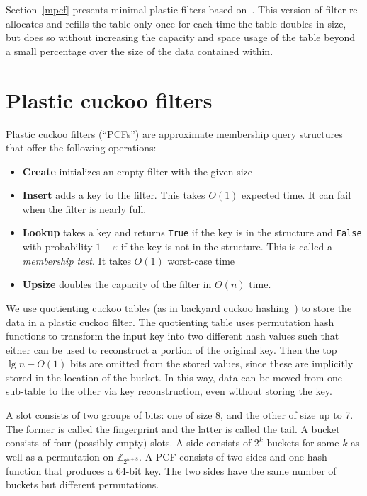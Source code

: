 \documentclass[letterpaper, 11pt]{article}
\newcommand{\ints}{\mathbb{Z}}
\begin{document}
Section~\ref{mpcf} presents minimal plastic filters based on~\cite{dysect}.
This version of filter re-allocates and refills the table only once for each time the table doubles in size, but does so without increasing the capacity and space usage of the table beyond a small percentage over the size of the data contained within.

\section{Plastic cuckoo filters}
\label{pcf}
Plastic cuckoo filters (``PCFs'') are approximate membership query structures that offer the following operations:

\begin{itemize}
\item {\bf Create} initializes an empty filter with the given size
\item {\bf Insert} adds a key to the filter.
  This takes $O(1)$ expected time.
  It can fail when the filter is nearly full.
\item {\bf Lookup} takes a key and returns \verb|True| if the key is in the structure and \verb|False| with probability $1-\varepsilon$ if the key is not in the structure.
  This is called a {\em membership test}.
  It takes $O(1)$ worst-case time
\item {\bf Upsize} doubles the capacity of the filter in $\Theta(n)$ time.
\end{itemize}

We use quotienting cuckoo tables (as in backyard cuckoo hashing~\cite{backyard}) to store the data in a plastic cuckoo filter.
The quotienting table uses permutation hash functions to transform the input key into two different hash values such that either can be used to reconstruct a portion of the original key.
Then the top $\lg n - O(1)$ bits are omitted from the stored values, since these are implicitly stored in the location of the bucket.
In this way, data can be moved from one sub-table to the other via key reconstruction, even without storing the key.

A slot consists of two groups of bits: one of size 8, and the other of size up to 7.
The former is called the fingerprint and the latter is called the tail.
A bucket consists of four (possibly empty) slots.
A side consists of $2^k$ buckets for some $k$ as well as a permutation on $\ints_{2^{k+8}}$.
A PCF consists of two sides and one hash function that produces a 64-bit key.
The two sides have the same number of buckets but different permutations.
\end{document}
